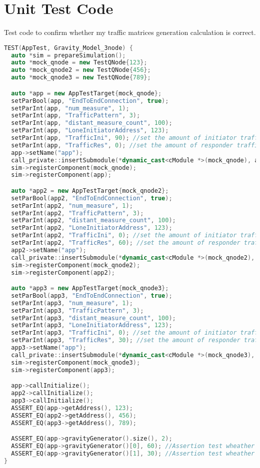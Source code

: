 \section{Unit Test Code}
Test code to confirm whether my traffic matrices generation calculation is correct.
\begin{lstlisting}[language=c++,caption=Test code for confirming the calculation, label=eval_code]
TEST(AppTest, Gravity_Model_3node) {
  auto *sim = prepareSimulation();
  auto *mock_qnode = new TestQNode{123};
  auto *mock_qnode2 = new TestQNode{456};
  auto *mock_qnode3 = new TestQNode{789};

  auto *app = new AppTestTarget{mock_qnode};
  setParBool(app, "EndToEndConnection", true);
  setParInt(app, "num_measure", 1);
  setParInt(app, "TrafficPattern", 3);
  setParInt(app, "distant_measure_count", 100);
  setParInt(app, "LoneInitiatorAddress", 123);
  setParInt(app, "TrafficIni", 90); //set the amount of initiator traffic
  setParInt(app, "TrafficRes", 0); //set the amount of responder traffic
  app->setName("app");
  call_private::insertSubmodule(*dynamic_cast<cModule *>(mock_qnode), app);
  sim->registerComponent(mock_qnode);
  sim->registerComponent(app);

  auto *app2 = new AppTestTarget{mock_qnode2};
  setParBool(app2, "EndToEndConnection", true);
  setParInt(app2, "num_measure", 1);
  setParInt(app2, "TrafficPattern", 3);
  setParInt(app2, "distant_measure_count", 100);
  setParInt(app2, "LoneInitiatorAddress", 123);
  setParInt(app2, "TrafficIni", 0); //set the amount of initiator traffic
  setParInt(app2, "TrafficRes", 60); //set the amount of responder traffic
  app2->setName("app");
  call_private::insertSubmodule(*dynamic_cast<cModule *>(mock_qnode2), app2);
  sim->registerComponent(mock_qnode2);
  sim->registerComponent(app2);

  auto *app3 = new AppTestTarget{mock_qnode3};
  setParBool(app3, "EndToEndConnection", true);
  setParInt(app3, "num_measure", 1);
  setParInt(app3, "TrafficPattern", 3);
  setParInt(app3, "distant_measure_count", 100);
  setParInt(app3, "LoneInitiatorAddress", 123);
  setParInt(app3, "TrafficIni", 0); //set the amount of initiator traffic
  setParInt(app3, "TrafficRes", 30); //set the amount of responder traffic
  app3->setName("app");
  call_private::insertSubmodule(*dynamic_cast<cModule *>(mock_qnode3), app3);
  sim->registerComponent(mock_qnode3);
  sim->registerComponent(app3);

  app->callInitialize();
  app2->callInitialize();
  app3->callInitialize();
  ASSERT_EQ(app->getAddress(), 123);
  ASSERT_EQ(app2->getAddress(), 456);
  ASSERT_EQ(app3->getAddress(), 789);

  ASSERT_EQ(app->gravityGenerator().size(), 2);
  ASSERT_EQ(app->gravityGenerator()[0], 60); //Assertion test wheather the amount of traffic from node 1 to node 2 is 60
  ASSERT_EQ(app->gravityGenerator()[1], 30); //Assertion test wheather the amount of traffic from node 1 to node 3 is 30
}
\end{lstlisting}